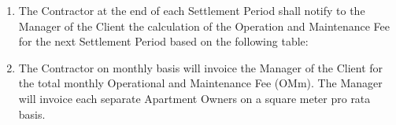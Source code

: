 \begin{enumerate}[label=\arabic*.]
	\item The Contractor at the end of each Settlement Period shall notify to the Manager of the Client the calculation of the Operation and Maintenance Fee for the next Settlement Period based on the following table:


\begin{center}
\end{center}

	\item The Contractor on monthly basis will invoice the Manager of the Client for the total monthly Operational and Maintenance Fee (OMm). The Manager will invoice each separate Apartment Owners on a square meter pro rata basis.

\end{enumerate}
